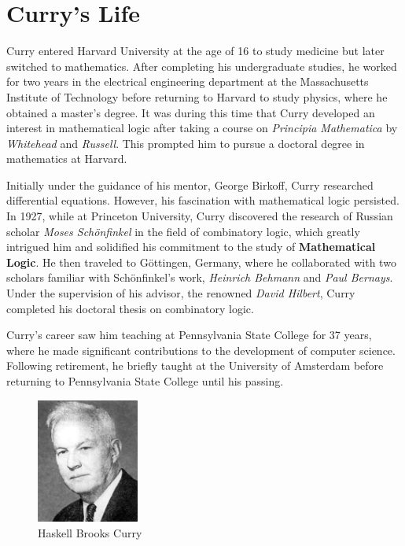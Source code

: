 \section{Curry's Life}
Curry entered Harvard University at the age of 16 to study medicine but later switched to mathematics. After completing his undergraduate studies, he worked for two years in the electrical engineering department at the Massachusetts Institute of Technology before returning to Harvard to study physics, where he obtained a master's degree. It was during this time that Curry developed an interest in mathematical logic after taking a course on \textit{Principia Mathematica}\cite{russell25} by \textit{Whitehead}\cite{alfred-north-whitehead} and \textit{Russell}\cite{bertrand-russell}. This prompted him to pursue a doctoral degree in mathematics at Harvard.

Initially under the guidance of his mentor, George Birkoff, Curry researched differential equations. However, his fascination with mathematical logic persisted. In 1927, while at Princeton University, Curry discovered the research of Russian scholar \textit{Moses Schönfinkel}\cite{moses-schonfinkel} in the field of combinatory logic, which greatly intrigued him and solidified his commitment to the study of \textbf{Mathematical Logic}. He then traveled to Göttingen, Germany, where he collaborated with two scholars familiar with Schönfinkel's work, \textit{Heinrich Behmann}\cite{heinrich-behmann} and \textit{Paul Bernays}\cite{paul-bernays}. Under the supervision of his advisor, the renowned \textit{David Hilbert}\cite{david-hilbert}, Curry completed his doctoral thesis on combinatory logic.

Curry's career saw him teaching at Pennsylvania State College for 37 years, where he made significant contributions to the development of computer science. Following retirement, he briefly taught at the University of Amsterdam before returning to Pennsylvania State College until his passing.

\begin{figure}
    \centering
    \includegraphics[width=0.3\textwidth]{figures/curry.jpg}
    \caption{Haskell Brooks Curry}
    \label{fig:curry}
\end{figure}
